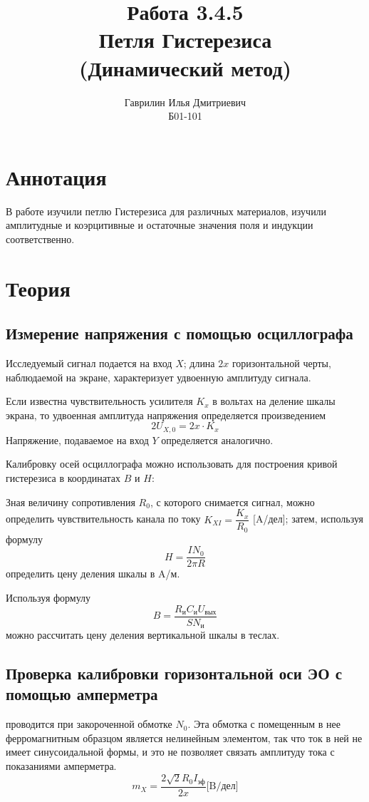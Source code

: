 \documentclass[a4paper, 12pt]{article}%
\author{Гаврилин Илья Дмитриевич \\
	Б01-101}
\title{\textbf{Работа 3.4.5 \\ 
		Петля Гистерезиса \\ (Динамический метод)}}
\begin{document}
	\maketitle
	\section{Аннотация}
	В работе изучили петлю Гистерезиса для различных материалов, изучили амплитудные и коэрцитивные и остаточные значения поля и индукции соответственно.
	\section{Теория}
	\subsection*{Измерение напряжения с помощью осциллографа}
	Исследуемый сигнал подается на вход $X$; длина $2x$ горизонтальной черты, наблюдаемой на экране, характеризует удвоенную амплитуду сигнала. 
	
	Если известна чувствительность усилителя $K_x$ в вольтах на деление шкалы экрана, то удвоенная амплитуда напряжения определяется произведением
	\[2U_{X, 0} = 2x \cdot K_x\]
	Напряжение, подаваемое на вход $Y$ определяется аналогично. 
	
	Калибровку осей осциллографа можно использовать для построения кривой гистерезиса в координатах $B$ и $H$:
	
	Зная величину сопротивления $R_0$, с которого снимается сигнал, можно определить чувствительность канала по току $K_{XI} = \dfrac{K_x}{R_0}$ [A/дел]; затем, используя формулу 
	\begin{equation}
		H = \dfrac{IN_0}{2\pi R}
	\end{equation}
	определить цену деления шкалы в A/м.
	
	Используя формулу 
	\begin{equation}
		B = \dfrac{R_{\text{и}}C_{\text{и}}U_{\text{вых}}}{SN_{\text{и}}}
	\end{equation}
	можно рассчитать цену деления вертикальной шкалы в теслах.
	\subsection*{Проверка калибровки горизонтальной оси ЭО с помощью амперметра}
	проводится при закороченной обмотке $N_0$. Эта обмотка с помещенным в нее ферромагнитным образцом является нелинейным элементом, так что ток в ней не имеет синусоидальной формы, и это не позволяет связать амплитуду тока с показаниями амперметра.
	\begin{equation}
		m_X = \dfrac{2 \sqrt{2} R_0 I_{\text{эф}}}{2x} \text{[B/дел]}
	\end{equation}
\end{document}
